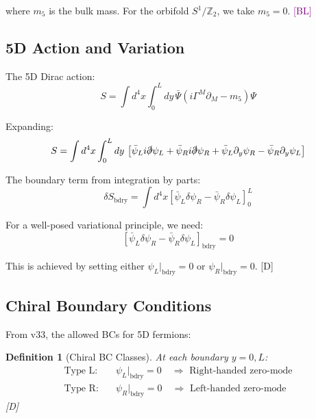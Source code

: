 \documentclass[11pt,a4paper]{article}
\newtheorem{definition}[theorem]{Definition}
\newcommand{\tagD}{\textcolor{blue!70!black}{[D]}}
\newcommand{\tagBL}{\textcolor{purple}{[BL]}}
\begin{document}
where $m_5$ is the bulk mass. For the orbifold $S^1/\mathbb{Z}_2$, we take $m_5 = 0$. \tagBL

\subsection{5D Action and Variation}

The 5D Dirac action:
\begin{equation}
\label{eq:5d-action}
S = \int d^4x \int_0^L dy\, \bar{\Psi}(i\Gamma^M \partial_M - m_5)\Psi
\end{equation}

Expanding:
\begin{equation}
\label{eq:5d-action-expand}
S = \int d^4x \int_0^L dy\, \left[\bar{\psi}_L i\slashed{\partial} \psi_L + \bar{\psi}_R i\slashed{\partial} \psi_R
+ \bar{\psi}_L \partial_y \psi_R - \bar{\psi}_R \partial_y \psi_L\right]
\end{equation}

The boundary term from integration by parts:
\begin{equation}
\label{eq:boundary-term}
\delta S_{\text{bdry}} = \int d^4x \left[\bar{\psi}_L \delta\psi_R - \bar{\psi}_R \delta\psi_L\right]_0^L
\end{equation}

For a well-posed variational principle, we need:
\begin{equation}
\label{eq:bdry-vanish}
\left[\bar{\psi}_L \delta\psi_R - \bar{\psi}_R \delta\psi_L\right]_{\text{bdry}} = 0
\end{equation}

This is achieved by setting either $\psi_L|_{\text{bdry}} = 0$ or $\psi_R|_{\text{bdry}} = 0$. \tagD

\subsection{Chiral Boundary Conditions}

From v33, the allowed BCs for 5D fermions:
\begin{definition}[Chiral BC Classes]
\label{def:chiral-bc}
At each boundary $y = 0, L$:
\begin{align}
\label{eq:bc-L}
\text{Type L:} \quad & \psi_L|_{\text{bdry}} = 0 \quad \Rightarrow \text{ Right-handed zero-mode} \\
\label{eq:bc-R}
\text{Type R:} \quad & \psi_R|_{\text{bdry}} = 0 \quad \Rightarrow \text{ Left-handed zero-mode}
\end{align}
\tagD
\end{definition}
\end{document}
